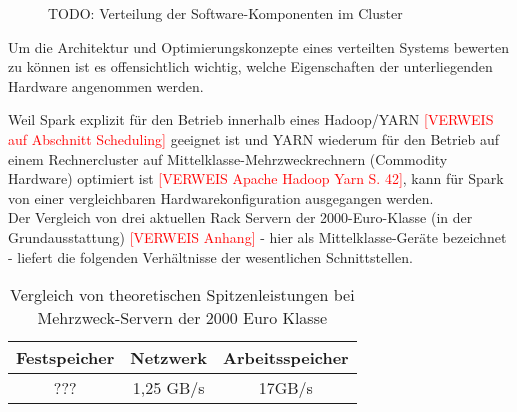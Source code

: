\begin{figure}[h]
\centering
  \caption{TODO: Verteilung der Software-Komponenten im Cluster}
\end{figure}

Um die Architektur und Optimierungskonzepte eines verteilten Systems bewerten zu können ist es offensichtlich wichtig, welche Eigenschaften der unterliegenden Hardware angenommen werden.

Weil Spark explizit für den Betrieb innerhalb eines Hadoop/YARN \textcolor{red}{[VERWEIS auf Abschnitt Scheduling]} geeignet ist und YARN wiederum für den Betrieb auf einem Rechnercluster auf Mittelklasse-Mehrzweckrechnern (Commodity Hardware) optimiert ist \textcolor{red}{[VERWEIS Apache Hadoop Yarn S. 42]}, kann für Spark von einer vergleichbaren Hardwarekonfiguration ausgegangen werden.\\

Der Vergleich von drei aktuellen Rack Servern der 2000-Euro-Klasse (in der Grundausstattung) \textcolor{red}{[VERWEIS Anhang]} - hier als Mittelklasse-Geräte bezeichnet - liefert die folgenden Verhältnisse der wesentlichen Schnittstellen.

\begin{table}[ht]
	\centering %
	\begin{tabular}{c c c} %
		\hline\hline %
		Festspeicher & Netzwerk & Arbeitsspeicher\\ [0.5ex] %
		\hline %
		??? & 1,25 GB/s & 17GB/s \\ %
		\hline %
	\end{tabular}
	\caption{Vergleich von theoretischen Spitzenleistungen bei Mehrzweck-Servern der 2000 Euro Klasse} %
	\label{table:vgldurchsatz} %
\end{table}

